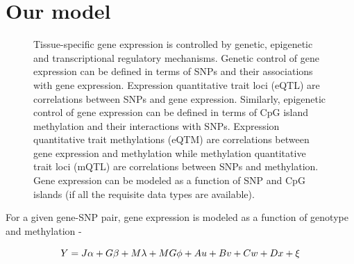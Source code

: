 \documentclass[hidelinks]{article}
\begin{document}
\section{Our model}

\begin{figure}[H]
\centering
{}
\caption[Relationships between mRNA, CpG and SNP]{Tissue-specific gene expression is controlled by genetic, epigenetic and transcriptional regulatory mechanisms. Genetic control of gene expression can be defined in terms of SNPs and their associations with gene expression. Expression quantitative trait loci (eQTL) are correlations between SNPs and gene expression.  Similarly, epigenetic control of gene expression can be defined in terms of CpG island methylation and their interactions with SNPs. Expression quantitative trait methylations (eQTM) are correlations between gene expression and methylation while methylation quantitative trait loci (mQTL) are correlations between SNPs and methylation. Gene expression can be modeled as a function of SNP and CpG islands (if all the requisite data types are available).} 
\label{fig1}
\end{figure}

%
%

For a given gene-SNP pair, gene expression is modeled as a function of genotype and methylation -

\begin{equation}
\large
Y = J\alpha + G\beta + M\lambda + MG\phi + Au + Bv + Cw + Dx + \xi
\end{equation}
\end{document}
